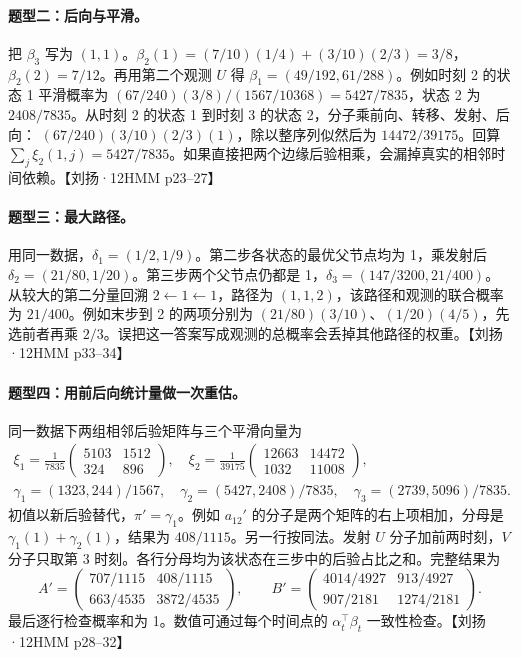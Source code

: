 \documentclass[UTF8,a4paper,zihao=-4,fontset=fandol]{ctexrep}
\begin{document}
\paragraph{题型二：后向与平滑。}
把 $\beta_3$ 写为 $(1,1)$。$\beta_2(1)=(7/10)(1/4)+(3/10)(2/3)=3/8$，$\beta_2(2)=7/12$。再用第二个观测 $U$ 得 $\beta_1=(49/192,61/288)$。例如时刻 2 的状态 1 平滑概率为 $(67/240)(3/8)/(1567/10368)=5427/7835$，状态 2 为 $2408/7835$。从时刻 2 的状态 1 到时刻 3 的状态 2，分子乘前向、转移、发射、后向：
$(67/240)(3/10)(2/3)(1)$，除以整序列似然后为 $14472/39175$。回算 $\sum_j\xi_2(1,j)=5427/7835$。如果直接把两个边缘后验相乘，会漏掉真实的相邻时间依赖。【刘扬·12HMM p23–27】

\paragraph{题型三：最大路径。}
用同一数据，$\delta_1=(1/2,1/9)$。第二步各状态的最优父节点均为 1，乘发射后 $\delta_2=(21/80,1/20)$。第三步两个父节点仍都是 1，$\delta_3=(147/3200,21/400)$。从较大的第二分量回溯 $2\gets1\gets1$，路径为 $(1,1,2)$，该路径和观测的联合概率为 $21/400$。例如末步到 2 的两项分别为 $(21/80)(3/10)$、$(1/20)(4/5)$，先选前者再乘 $2/3$。误把这一答案写成观测的总概率会丢掉其他路径的权重。【刘扬·12HMM p33–34】

\paragraph{题型四：用前后向统计量做一次重估。}
同一数据下两组相邻后验矩阵与三个平滑向量为
\[
\begin{gathered}
\xi_1=\frac1{7835}\begin{pmatrix}5103&1512\\324&896\end{pmatrix},\quad
\xi_2=\frac1{39175}\begin{pmatrix}12663&14472\\1032&11008\end{pmatrix},\\
\gamma_1=(1323,244)/1567,\quad
\gamma_2=(5427,2408)/7835,\quad
\gamma_3=(2739,5096)/7835 .
\end{gathered}
\]
初值以新后验替代，$\pi'=\gamma_1$。例如 $a_{12}'$ 的分子是两个矩阵的右上项相加，分母是 $\gamma_1(1)+\gamma_2(1)$，结果为 $408/1115$。另一行按同法。发射 $U$ 分子加前两时刻，$V$ 分子只取第 3 时刻。各行分母均为该状态在三步中的后验占比之和。完整结果为
\[
A'=\begin{pmatrix}707/1115&408/1115\\663/4535&3872/4535\end{pmatrix},\qquad
B'=\begin{pmatrix}4014/4927&913/4927\\907/2181&1274/2181\end{pmatrix}.
\]
最后逐行检查概率和为 1。数值可通过每个时间点的 $\alpha_t^\top\beta_t$ 一致性检查。【刘扬·12HMM p28–32】
\end{document}
